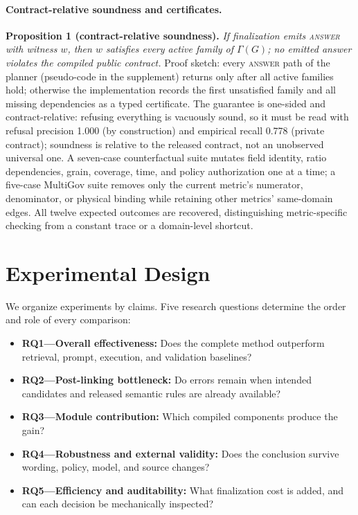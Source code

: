 \documentclass[letterpaper]{article}
\begin{document}
\paragraph{Contract-relative soundness and certificates.}
 \textbf{Proposition 1 (contract-relative soundness).} \emph{If finalization emits \textsc{answer} with witness $w$, then $w$ satisfies every active family of $\Gamma(G)$; no emitted answer violates the compiled public contract.} Proof sketch: every \textsc{answer} path of the planner (pseudo-code in the supplement) returns only after all active families hold; otherwise the implementation records the first unsatisfied family and all missing dependencies as a typed certificate. The guarantee is one-sided and contract-relative: refusing everything is vacuously sound, so it must be read with refusal precision 1.000 (by construction) and empirical recall 0.778 (private contract); soundness is relative to the released contract, not an unobserved universal one. A seven-case counterfactual suite mutates field identity, ratio dependencies, grain, coverage, time, and policy authorization one at a time; a five-case MultiGov suite removes only the current metric's numerator, denominator, or physical binding while retaining other metrics' same-domain edges. All twelve expected outcomes are recovered, distinguishing metric-specific checking from a constant trace or a domain-level shortcut.

\section{Experimental Design}

We organize experiments by claims. Five research questions determine the order and role of every comparison:
\begin{itemize}
    \item \textbf{RQ1---Overall effectiveness:} Does the complete method outperform retrieval, prompt, execution, and validation baselines?
    \item \textbf{RQ2---Post-linking bottleneck:} Do errors remain when intended candidates and released semantic rules are already available?
    \item \textbf{RQ3---Module contribution:} Which compiled components produce the gain?
    \item \textbf{RQ4---Robustness and external validity:} Does the conclusion survive wording, policy, model, and source changes?
    \item \textbf{RQ5---Efficiency and auditability:} What finalization cost is added, and can each decision be mechanically inspected?
\end{itemize}
\end{document}
